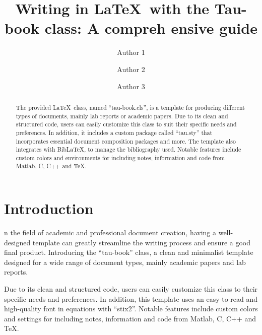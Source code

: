 \documentclass[10pt,a4paper,twoside]{tau-book}
\title{Writing in \LaTeX\ with the Tau-book class: A compreh
ensive guide}
\author[a,1]{Author 1}
\author[b,2]{Author 2}
\author[b,c,3]{Author 3}
\affil[a]{Department of Mathematics}
\affil[b]{Department of Biology}
\affil[c]{University of Alpha}
\begin{document}
	
    \maketitle
    \thispagestyle{firststyle}




\begin{abstract}
    The provided \LaTeX\ class, named ``tau-book.cls'', is a template for producing different types of documents, mainly lab reports or academic papers. Due to its clean and structured code, users can easily customize this class to suit their specific needs and preferences. In addition, it includes a custom package called ``tau.sty'' that incorporates essential document composition packages and more. The template also integrates with BibLaTeX, to manage the bibliography used. Notable features include custom colors and environments for including notes, information and code from Matlab, C, C++ and \TeX.
\end{abstract}




\section{Introduction}

    n the field of academic and professional document creation, having a well-designed template can greatly streamline the writing process and ensure a good final product. Introducing the ``tau-book'' class, a clean and minimalist template designed for a wide range of document types, mainly academic papers and lab reports. 

    Due to its clean and structured code, users can easily customize this class to their specific needs and preferences. In addition, this template uses an easy-to-read and high-quality font in equations with ``stix2''. Notable features include custom colors and settings for including notes, information and code from Matlab, C, C++ and \TeX.
    
\end{document}
